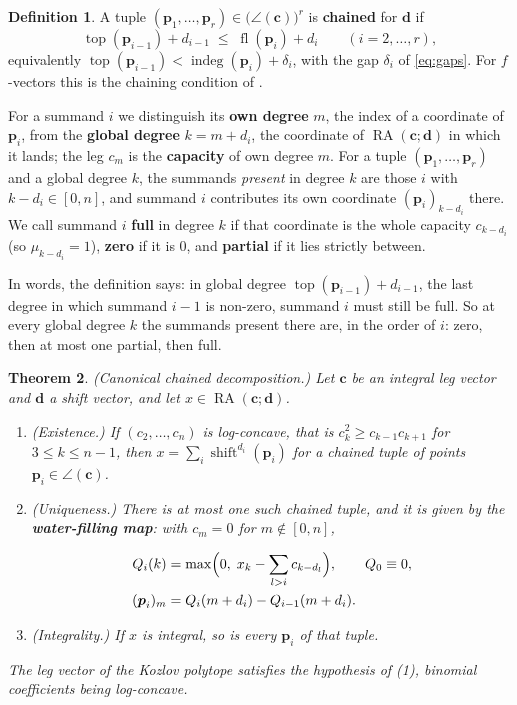 \documentclass[11pt, a4paper, abstract=yes]{scrartcl}
\theoremstyle{definition}
\newtheorem{definition}{Definition}
\theoremstyle{remark}
\theoremstyle{plain}
\newtheorem{theorem}[definition]{Theorem}
\newcommand{\vek}[1]{\boldsymbol{#1}}
\theoremstyle{remark}
\theoremstyle{plain}
\newcommand{\shift}{\operatorname{shift}}
\newcommand{\indeg}{\operatorname{indeg}}
\newcommand{\tp}{\operatorname{top}}
\newcommand{\rasimp}{\angle}
\newcommand{\RA}{\operatorname{RA}}
\newcommand{\fl}{\operatorname{fl}}
\newcommand{\leandiscof}[1]{\tikz[baseline=-0.6ex]\fill[#1] (0,0) circle (0.6ex);}
\newcommand{\leanfull}{\leandiscof{leanfull}}
\newcommand{\leanmark}[1]{\leavevmode{\reversemarginpar\marginnote{\raggedleft#1}}}
\begin{document}
\begin{definition}
A tuple \((\vek p_1,\dots,\vek p_r)\in\bigl(\rasimp(\vek c)\bigr)^r\) is \textbf{chained} for
\(\vek d\) if
\begin{equation}\label{eq:chained}
  \tp(\vek p_{i-1})+d_{i-1}\;\le\;\fl(\vek p_i)+d_i\qquad(i=2,\dots,r),
\end{equation}
equivalently \(\tp(\vek p_{i-1})<\indeg(\vek p_i)+\delta_i\), with the gap \(\delta_i\) of
\eqref{eq:gaps}. For
\(f\)-vectors this is the chaining condition of \autocite[Definition 19]{SnellmanArticle2}.
\label{def-chained-points}
\end{definition}

For a summand \(i\) we distinguish its \textbf{own degree} \(m\), the index of a coordinate of
\(\vek p_i\), from the \textbf{global degree} \(k=m+d_i\), the coordinate of \(\RA(\vek c;\vek d)\) in which
it lands; the leg \(c_m\) is the \textbf{capacity} of own degree \(m\).
For a tuple \((\vek p_1,\dots,\vek p_r)\) and a global degree \(k\), the summands \emph{present} in
degree \(k\) are those \(i\) with \(k-d_i\in[0,n]\), and summand \(i\) contributes its own coordinate
\((\vek p_i)_{k-d_i}\) there. We call summand \(i\) \textbf{full} in degree \(k\) if that coordinate is the
whole capacity \(c_{k-d_i}\) (so \(\mu_{k-d_i}=1\)), \textbf{zero} if it is \(0\), and \textbf{partial} if it lies
strictly between.

In words, the definition says: in global degree \(\tp(\vek p_{i-1})+d_{i-1}\), the last degree in
which summand \(i-1\) is non-zero, summand \(i\) must still be full. So at every global degree \(k\)
the summands present there are, in the order of \(i\): zero, then at most one partial, then full.

\begin{theorem}
\leanmark{\leanfull}(\emph{Canonical chained decomposition.}) Let \(\vek c\) be an integral leg vector and \(\vek d\) a
shift vector, and let \(x\in\RA(\vek c;\vek d)\).
\begin{enumerate}
\item (\emph{Existence.}) If \((c_2,\dots,c_n)\) is log-concave, that is \(c_k^2\ge c_{k-1}c_{k+1}\) for
\(3\le k\le n-1\), then \(x=\sum_i\shift^{d_i}(\vek p_i)\) for a chained tuple of points
\(\vek p_i\in\rasimp(\vek c)\).
\item (\emph{Uniqueness.}) There is at most one such chained tuple, and it is given by the
\textbf{water-filling map}: with \(c_m=0\) for \(m\notin[0,n]\),

\begin{equation}\label{eq:water}
\begin{aligned}
  Q_i(k)&=\max\Bigl(0,\;x_k-\sum_{l>i}c_{k-d_l}\Bigr),\qquad Q_0\equiv0,\\
  (\vek p_i)_m&=Q_i(m+d_i)-Q_{i-1}(m+d_i).
\end{aligned}
\end{equation}
\item (\emph{Integrality.}) If \(x\) is integral, so is every \(\vek p_i\) of that tuple.
\end{enumerate}
The leg vector of the Kozlov polytope satisfies the hypothesis of (1), binomial coefficients being
log-concave.
\label{thm-chained}
\end{theorem}
\end{document}
